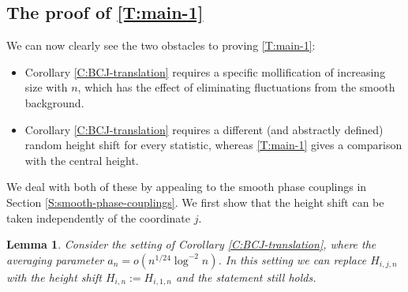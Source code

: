 \documentclass[11pt,twoside]{amsart}
\theoremstyle{plain}
\newtheorem{lem}[thm]{Lemma}
\numberwithin{quest}{section}
\theoremstyle{remark}
\numberwithin{rem}{section}
\theoremstyle{definition}
\begin{document}
	\subsection{The proof of \cref{T:main-1}}
	
	We can now clearly see the two obstacles to proving \cref{T:main-1}:
	\begin{itemize}[nosep]
		\item Corollary \ref{C:BCJ-translation} requires a specific mollification of increasing size with $n$, which has the effect of eliminating fluctuations from the smooth background.
		\item Corollary \ref{C:BCJ-translation} requires a different (and abstractly defined) random height shift for every statistic, whereas \cref{T:main-1} gives a comparison with the central height.
	\end{itemize} 
	We deal with both of these by appealing to the smooth phase couplings in Section \ref{S:smooth-phase-couplings}. We first show that the height shift can be taken independently of the coordinate $j$.
	
	\begin{lem}
\label{L:j-independent}
Consider the setting of Corollary \ref{C:BCJ-translation}, where the averaging parameter $a_n = o(n^{1/24} \log^{-2} n)$. In this setting we can replace $H_{i, j, n}$ with the height shift $H_{i, n}:=H_{i, 1, n}$ and the statement still holds. 
	\end{lem}
	
\end{document}
